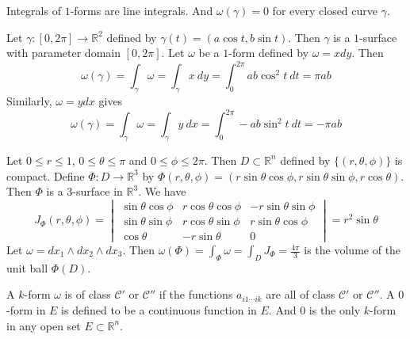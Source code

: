 \begin{remark}[example 1]
	Integrals of $1$-forms are line integrals.
	And $\omega(\gamma) = 0$ for every closed curve $\gamma$.\cite[10.12a]{rudin}
\end{remark}

\begin{remark}[example 2]
	Let $\gamma : [ 0,2\pi ] \to \mathbb{R}^2$ defined by $\gamma(t) = (a\cos t , b\sin t)$.
	Then $\gamma$ is a $1$-surface with parameter domain $[0,2\pi]$.\cite[10.12b]{rudin}
	Let $\omega$ be a $1$-form defined by $\omega = x dy$.
	Then 
	\begin{equation*}
		\omega(\gamma) = \int_\gamma \omega = \int_\gamma x\ dy = \int_0^{2\pi} ab\cos^2 t\ dt = \pi ab
	\end{equation*}
	Similarly, $\omega = ydx$ gives
	\begin{equation*}
		\omega(\gamma) = \int_\gamma \omega = \int_\gamma y\ dx = \int_0^{2\pi} -ab\sin^2 t\ dt = -\pi ab
	\end{equation*}
\end{remark}

\begin{remark}[example 3]
	Let $0 \le r \le 1$, $0 \le \theta \le \pi$ and $0 \le \phi \le 2\pi$.
	Then $D \subset \mathbb{R}^n$ defined by $\{(r,\theta,\phi)\}$ is compact.
	Define $\Phi : D \to \mathbb{R}^3$ by $\Phi(r,\theta,\phi) = (r\sin \theta \cos \phi, r\sin \theta \sin \phi, r \cos \theta)$.
	Then $\Phi$ is a $3$-surface in $\mathbb{R}^3$.
	We have
	\begin{equation*}
		J_\Phi(r,\theta,\phi) = \begin{vmatrix}
			\sin \theta \cos \phi & r\cos \theta \cos \phi & -r\sin \theta \sin \phi \\
			\sin \theta \sin \phi & r\cos \theta \sin \phi & r \sin \theta \cos \phi \\
			\cos \theta & -r\sin \theta & 0 
		\end{vmatrix} = r^2\sin \theta
	\end{equation*}
	Let $\omega = dx_1 \wedge dx_2 \wedge dx_3$.
	Then $\omega(\Phi) = \int_\Phi \omega = \int_D J_\Phi = \frac{4\pi}{3}$ is the volume of the unit ball $\Phi(D)$.
\end{remark}

\begin{remark}
	A $k$-form $\omega$ is of class $\mathscr{C}'$ or $\mathscr{C}''$ if the functions $a_{i1\cdots ik}$ are all of class $\mathscr{C}'$ or $\mathscr{C}''$.
	A $0$-form in $E$ is defined to be a continuous function in $E$.
	And $0$ is the only $k$-form in any open set $E \subset \mathbb{R}^n$.
\end{remark}

